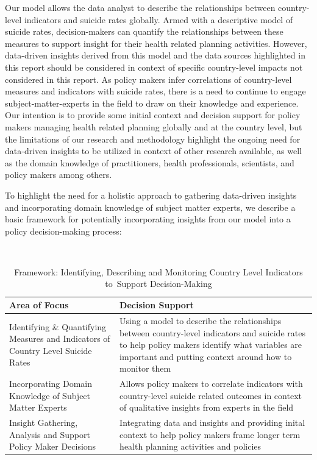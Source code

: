 \documentclass[]{article}
\begin{document}
Our model allows the data analyst to describe the relationships between
country-level indicators and suicide rates globally. Armed with a
descriptive model of suicide rates, decision-makers can quantify the
relationships between these measures to support insight for their health
related planning activities. However, data-driven insights derived from
this model and the data sources highlighted in this report should be
considered in context of specific country-level impacts not considered
in this report. As policy makers infer correlations of country-level
measures and indicators with suicide rates, there is a need to continue
to engage subject-matter-experts in the field to draw on their knowledge
and experience. Our intention is to provide some initial context and
decision support for policy makers managing health related planning
globally and at the country level, but the limitations of our research
and methodology highlight the ongoing need for data-driven insights to
be utilized in context of other research available, as well as the
domain knowledge of practitioners, health professionals, scientists, and
policy makers among others.

To highlight the need for a holistic approach to gathering data-driven
insights and incorporating domain knowledge of subject matter experts,
we describe a basic framework for potentially incorporating insights
from our model into a policy decision-making process:

\begin{table}[H]
\centering 
\caption{Framework: Identifying, Describing and Monitoring Country Level Indicators to Support Decision-Making}
\
\begin{tabular}{p{7cm}p{9cm}}  
\hline  
   Area of Focus  & Decision Support  \\   
\hline 
 Identifying \& Quantifying Measures and Indicators of Country Level Suicide Rates &  Using a model to describe the relationships between country-level indicators and suicide rates to help policy makers identify what variables are important and putting context around how to monitor them \\   
 \hline 
Incorporating Domain Knowledge of Subject Matter Experts & Allows policy makers to correlate indicators with country-level suicide related outcomes in context of qualitative insights from experts in the field \\   
\hline 
Insight Gathering, Analysis and Support Policy Maker Decisions & Integrating data and insights and providing inital context to help policy makers frame longer term health planning activities and policies \\
\hline 
\end{tabular} 
\end{table}
\end{document}
